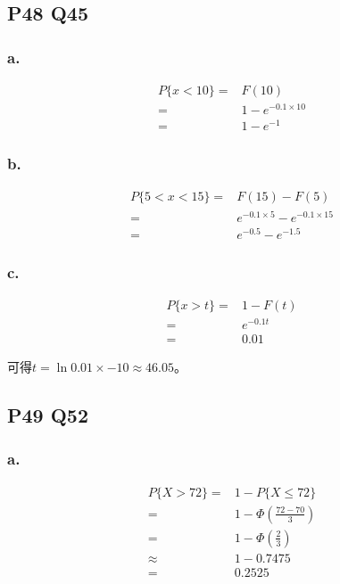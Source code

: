 \documentclass[a4paper,12pt]{ctexart}
\begin{document}
\subsection*{P48 Q45}

\subsubsection*{a.}
\begin{align*}
	P\{x < 10\} =& F(10)\\
	=& 1 - e^{-0.1 \times 10}\\
	=& 1 - e^{-1}
\end{align*}

\subsubsection*{b.}
\begin{align*}
	P\{5 < x < 15\} =& F(15) - F(5)\\
	=& e^{-0.1 \times 5} - e^{-0.1 \times 15}\\
	=& e^{-0.5} - e^{-1.5}
\end{align*}

\subsubsection*{c.}
\begin{align*}
	P\{x > t\} =& 1 - F(t)\\
	=& e^{-0.1t}\\
	=& 0.01
\end{align*}

可得$t = \ln 0.01 \times -10 \approx 46.05$。

\subsection*{P49 Q52}

\subsubsection*{a.}
\begin{align*}
	P\{X > 72\} =& 1 - P\{X \leq 72\}\\
	=& 1 - \Phi\left(\frac{72 - 70}{3}\right)\\
	=& 1 - \Phi\left(\frac{2}{3}\right)\\
	\approx& 1 - 0.7475\\
	=& 0.2525
\end{align*}
\end{document}
